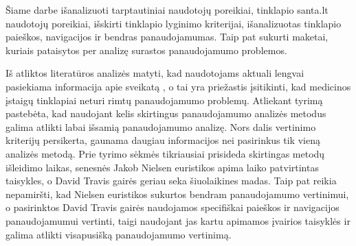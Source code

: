 \documentclass{VUMIFPSkursinis}
\begin{document}
%



Šiame darbe išanalizuoti tarptautiniai naudotojų poreikiai, tinklapio santa.lt naudotojų poreikiai, išskirti tinklapio lyginimo kriterijai, išanalizuotas tinklapio paieškos, navigacijos ir bendras panaudojamumas. Taip pat sukurti maketai, kuriais pataisytos per analizę surastos panaudojamumo problemos.

Iš atliktos literatūros analizės matyti, kad naudotojams aktuali lengvai pasiekiama informacija apie sveikatą \cite{EmergingmHealthEn}\cite{InternetUseByPublicHKEn}, o tai yra priežastis įsitikinti, kad medicinos įstaigų tinklapiai neturi rimtų panaudojamumo problemų. Atliekant tyrimą pastebėta, kad naudojant kelis skirtingus panaudojamumo analizės metodus galima atlikti labai išsamią panaudojamumo analizę. Nors dalis vertinimo kriterijų persikerta, gaunama daugiau informacijos nei pasirinkus tik vieną analizės metodą. Prie tyrimo sėkmės tikriausiai prisideda skirtingas metodų išleidimo laikas, senesnės Jakob Nielsen euristikos apima laiko patvirtintas taisykles, o David Travis gairės geriau seka šiuolaikines madas. Taip pat reikia nepamiršti, kad Nielsen euristikos sukurtos bendram panaudojamumo vertinimui, o pasirinktos David Travis gairės naudojamos specifiškai paieškos ir navigacijos panaudojamumui vertinti, taigi naudojant jas kartu apimamos įvairios taisyklės ir galima atlikti visapusišką panaudojamumo vertinimą.


\printbibliography[heading=bibintoc, title=Šaltiniai]  %
\end{document}
